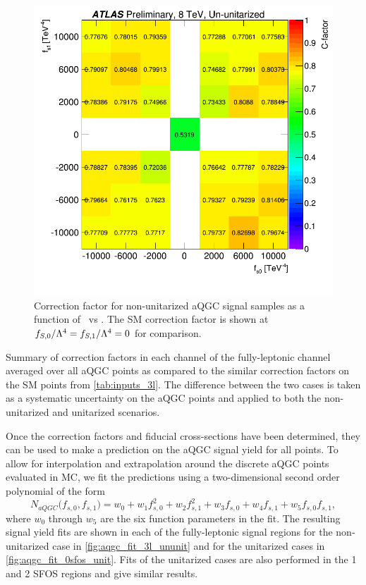 \begin{figure}[htb]
\centering
\includegraphics[width=.8\textwidth]{figures/aQGC/cfactor_chargesum.png}
\caption{Correction factor for non-unitarized aQGC signal samples as a function of \fszero~vs \fsone.
The SM correction factor is shown at $f_{S,0}/\Lambda^4=f_{S,1}/\Lambda^4=0$ for comparison.}
\label{fig:aqgc_cfactor_3l}
\end{figure}


\begin{table}[htb]
\centering

\caption{Summary of correction factors in each channel of the fully-leptonic channel 
averaged over all aQGC points as compared to the similar correction factors on the SM 
points from \tab\ref{tab:inputs_3l}. The difference between the two cases
is taken as a systematic uncertainty on the aQGC points and applied to both the 
non-unitarized and unitarized scenarios.}
\label{tab:aqgc_cfactor_3l_summary}
\end{table}

Once the correction factors and fiducial cross-sections have been determined,
they can be used to make a prediction on the aQGC signal yield 
for all points.  To allow for interpolation and extrapolation
around the discrete aQGC points evaluated in MC, we 
fit the predictions using a two-dimensional second order polynomial of 
the form
\begin{equation}
N_{aQGC}\big(f_{s,0},f_{s,1}\big) = w_0 + w_1 f_{s,0}^2 + w_2 f_{s,1}^2
+ w_3 f_{s,0} + w_4  f_{s,1} + w_5 f_{s,0} f_{s,1},
\label{eq:aqgc_fit_function}
\end{equation}
where $w_0$ through $w_5$ are the six function parameters in the fit.
The resulting signal yield fits are shown in each of the fully-leptonic signal 
regions for the non-unitarized case in \fig\ref{fig:aqgc_fit_3l_ununit}
and for the unitarized cases in \fig\ref{fig:aqgc_fit_0sfos_unit}.
Fits of the unitarized cases are also performed in the 1 and 2 SFOS regions and give similar results. 



